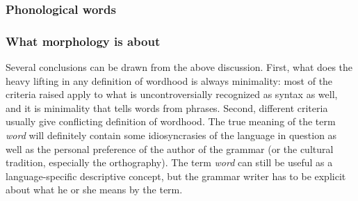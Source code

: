 \documentclass[UTF8, a4paper, oneside, scheme=plain]{ctexart}
\newcommand*{\term}[1]{\emph{#1}}
\begin{document}
\subsubsection{Phonological words}\label{sec:phonological-word}

\subsubsection{What morphology is about}

Several conclusions can be drawn from the above discussion.
First, what does the heavy lifting in any definition of wordhood 
is always minimality:
most of the criteria raised apply to what is uncontroversially recognized as syntax as well,
and it is minimality that tells words from phrases.
Second, different criteria usually give conflicting definition of wordhood.
The true meaning of the term \term{word}
will definitely contain some idiosyncrasies 
of the language in question as well as the personal preference of the author of the grammar
(or the cultural tradition, especially the orthography).
The term \term{word} can still be useful as a language-specific descriptive concept,
but the grammar writer has to be explicit about what he or she means by the term.
\end{document}
